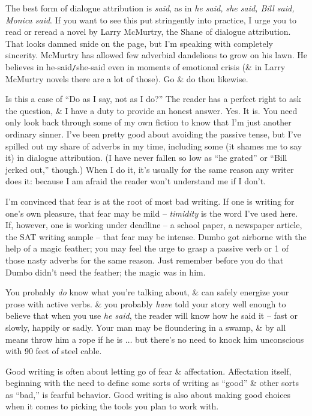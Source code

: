 \documentclass{article}
\numberwithin{equation}{section}
\begin{document}
The best form of dialogue attribution is \textit{said}, as in \textit{he said, she said, Bill said, Monica said}. If you want to see this put stringently into practice, I urge you to read or reread a novel by Larry McMurtry, the Shane of dialogue attribution. That looks damned snide on the page, but I'm speaking with completely sincerity. McMurtry has allowed few adverbial dandelions to grow on his lawn. He believes in he-said{\tt/}she-said even in moments of emotional crisis (\& in Larry McMurtry novels there are a lot of those). Go \& do thou likewise.

Is this a case of ``Do as I say, not as I do?'' The reader has a perfect right to ask the question, \& I have a duty to provide an honest answer. Yes. It is. You need only look back through some of my own fiction to know that I'm just another ordinary sinner. I've been pretty good about avoiding the passive tense, but I've spilled out my share of adverbs in my time, including some (it shames me to say it) in dialogue attribution. (I have never fallen so low as ``he grated'' or ``Bill jerked out,'' though.) When I do it, it's usually for the same reason any writer does it: because I am afraid the reader won't understand me if I don't.

I'm convinced that fear is at the root of most bad writing. If one is writing for one's own pleasure, that fear may be mild -- \textit{timidity} is the word I've used here. If, however, one is working under deadline -- a school paper, a newspaper article, the SAT writing sample -- that fear may be intense. Dumbo got airborne with the help of a magic feather; you may feel the urge to grasp a passive verb or 1 of those nasty adverbs for the same reason. Just remember before you do that Dumbo didn't need the feather; the magic was in him.

You probably \textit{do} know what you're talking about, \& can safely energize your prose with active verbs. \& you probably \textit{have} told your story well enough to believe that when you use \textit{he said}, the reader will know how he said it -- fast or slowly, happily or sadly. Your man may be floundering in a swamp, \& by all means throw him a rope if he is $\ldots$ but there's no need to knock him unconscious with 90 feet of steel cable.

Good writing is often about letting go of fear \& affectation. Affectation itself, beginning with the need to define some sorts of writing as ``good'' \& other sorts as ``bad,'' is fearful behavior. Good writing is also about making good choices when it comes to picking the tools you plan to work with.
\end{document}

